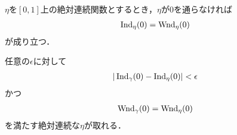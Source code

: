 	\begin{screen}
		\begin{thm}
			$\eta$を$[0,1]$上の絶対連続関数とするとき，$\eta$が$0$を通らなければ
			\begin{align}
				\operatorname{Ind}_{\eta}(0) = \operatorname{Wnd}_{\eta}(0)
			\end{align}
			が成り立つ．
		\end{thm}
	\end{screen}
	
	\begin{sketch}
		
	\end{sketch}
	
	\begin{screen}
		\begin{thm}
			任意の$\epsilon$に対して
			\begin{align}
				|\operatorname{Ind}_{\gamma}(0) - \operatorname{Ind}_{\eta}(0)| < \epsilon
			\end{align}
			かつ
			\begin{align}
				\operatorname{Wnd}_{\gamma}(0) = \operatorname{Wnd}_{\eta}(0)
			\end{align}
			を満たす絶対連続な$\eta$が取れる．
		\end{thm}
	\end{screen}
	
